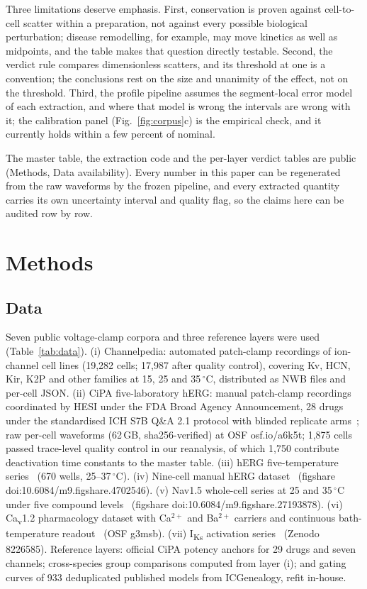 \documentclass[11pt,a4paper]{article}
\begin{document}
Three limitations deserve emphasis. First, conservation is proven against
cell-to-cell scatter within a preparation, not against every possible biological
perturbation; disease remodelling, for example, may move kinetics as well as
midpoints, and the table makes that question directly testable. Second, the
verdict rule compares dimensionless scatters, and its threshold at one is a
convention; the conclusions rest on the size and unanimity of the effect, not on
the threshold. Third, the profile pipeline assumes the segment-local error model
of each extraction, and where that model is wrong the intervals are wrong with
it; the calibration panel (Fig.~\ref{fig:corpus}c) is the empirical check, and
it currently holds within a few percent of nominal.

The master table, the extraction code and the per-layer verdict tables are
public (Methods, Data availability). Every number in this paper can be
regenerated from the raw waveforms by the frozen pipeline, and every extracted
quantity carries its own uncertainty interval and quality flag, so the claims
here can be audited row by row.

\section{Methods}

\subsection{Data}

Seven public voltage-clamp corpora and three reference layers were used
(Table~\ref{tab:data}). (i) Channelpedia: automated patch-clamp recordings of
ion-channel cell lines (19,282 cells; 17,987 after quality control), covering
Kv, HCN, Kir, K2P and other families at 15, 25 and 35\,$^\circ$C, distributed as
NWB files and per-cell JSON. (ii) CiPA five-laboratory hERG: manual patch-clamp
recordings coordinated by HESI under the FDA Broad Agency Announcement, 28 drugs
under the standardised ICH S7B Q\&A 2.1 protocol with blinded replicate
arms~\cite{AlvarezBaron2025}; raw per-cell waveforms (62\,GB, sha256-verified)
at OSF osf.io/a6k5t; 1,875 cells passed trace-level quality control in our
reanalysis, of which 1,750 contribute deactivation time constants to the master
table. (iii) hERG five-temperature series~\cite{Lei2019b} (670 wells,
25--37\,$^\circ$C). (iv) Nine-cell manual hERG dataset~\cite{Beattie2018}
(figshare doi:10.6084/m9.figshare.4702546). (v) Nav1.5 whole-cell series at 25
and 35\,$^\circ$C under five compound levels~\cite{Lei2025} (figshare
doi:10.6084/m9.figshare.27193878). (vi) Ca\textsubscript{v}1.2 pharmacology
dataset with Ca$^{2+}$ and Ba$^{2+}$ carriers and continuous bath-temperature
readout~\cite{Ren2022} (OSF g3msb). (vii) I\textsubscript{Ks} activation
series~\cite{Fedida2024,Chan2023} (Zenodo 8226585). Reference layers: official
CiPA potency anchors for 29 drugs and seven channels; cross-species group
comparisons computed from layer (i); and gating curves of 933 deduplicated
published models from ICGenealogy, refit in-house.
\end{document}
